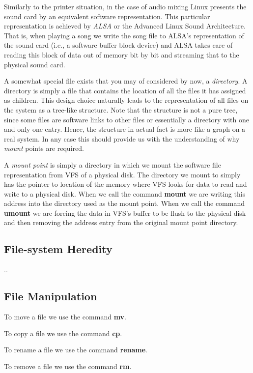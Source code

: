 Similarly to the printer situation, in the case of audio mixing
Linux presents the sound card by an equivalent software representation.
This particular representation is achieved by \emph{ALSA} or the
Advanced Linux Sound Architecture. That is, when playing a song we
write the song file to ALSA's representation of the sound card
(i.e., a software buffer block device) and ALSA takes care of reading
this block of data out of memory bit by bit and streaming that to the
physical sound card.

A somewhat special file exists that you may of considered by now, a
\emph{directory}. A directory is simply a file that contains the location
of all the files it has assigned as children. This design choice naturally
leads to the representation of all files on the system as a tree-like structure.
Note that the structure is not a pure tree, since some files are software links
to other files or essentially a directory with one and only one entry. Hence,
the structure in actual fact is more like a graph on a real system. In any
case this should provide us with the understanding of why \emph{mount} points
are required.

A \emph{mount point} is simply a directory in which we mount the software file
representation from VFS of a physical disk. The directory we mount to simply
has the pointer to location of the memory where VFS looks for data to read and
write to a physical disk. When we call the command \textbf{mount} we are writing
this address into the directory used as the mount point. When we call the command
\textbf{umount} we are forcing the data in VFS's buffer to be flush to the physical
disk and then removing the address entry from the original mount point directory.

\subsection{File-system Heredity}
..

\subsection{File Manipulation}

\begin{defn}
	To move a file we use the command \textbf{mv}.
\end{defn}

\begin{defn}
	To copy a file we use the command \textbf{cp}.
\end{defn}

\begin{defn}
	To rename a file we use the command \textbf{rename}.
\end{defn}

\begin{defn}
	To remove a file we use the command \textbf{rm}.
\end{defn}
